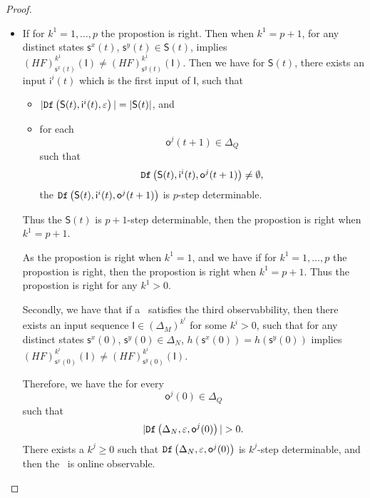 \begin{appendices}
\begin{proof}
\begin{itemize}
\item If for $k^1=1,\ldots, p$ the propostion is right. Then when $k^1=p+1$, for any distinct states $\mathsf{s}^{x}(t)$, $\mathsf{s}^{y}(t) \in \mathsf{S}(t)$, implies $(HF)^{k^1}_{\mathsf{s}^{x}(t)}(\mathsf{I})\neq (HF)^{k^1}_{\mathsf{s}^{y}(t)}(\mathsf{I})$. Then we have for $\mathsf{S}(t)$,
 there exists an input $\mathsf{i}^{i}(t)$ which is the first input of $\mathsf{I}$, such that
 \begin{itemize}
\item  $|{\tt Df}\left(\mathsf{S}(t),\mathsf{i}^{i}(t),\varepsilon\right)|=|\mathsf{S}(t)|$, and 
 \item  for each \[\mathsf{o}^{j}(t+1)\in \Delta_Q\] such that \[{\tt Df}\left(\mathsf{S}(t),\mathsf{i}^{i}(t),\mathsf{o}^{j}(t+1)\right)\ne \emptyset,\]  the ${\tt Df}\left(\mathsf{S}(t),\mathsf{i}^{i}(t),\mathsf{o}^{j}(t+1)\right)$ is $p$-step determinable.
 \end{itemize}
Thus the $\mathsf{S}(t)$ is $p+1$-step determinable, then the propostion is right when $k^1 =p+1$.

As the propostion is right when $k^1 =1$, and we have if for $k^1=1,\ldots, p$ the propostion is right, then the propostion is right when $k^1=p+1$. Thus the propostion is right for any $k^1>0$.

Secondly, we have that if a \BCN\ satisfies the third observabbility, then there exists an input sequence $\mathsf{I}\in(\Delta_M)^{k^i}$ for some $k^i >0$, such that for any distinct states $\mathsf{s}^{x}(0)$, $\mathsf{s}^{y}(0) \in \Delta_N$, $h(\mathsf{s}^{x}(0))=h(\mathsf{s}^{y}(0))$ implies $(HF)^{k^i}_{\mathsf{s}^{x}(0)}(\mathsf{I})\neq (HF)^{k^i}_{\mathsf{s}^{y}(0)}(\mathsf{I})$. 

Therefore, we have the for every \[\mathsf{o}^{j}(0)\in \Delta_Q\] such that \[|\Ded\left(\Delta_N,\varepsilon, \mathsf{o}^{j}(0)\right)|> 0.\] There exists a $k^{j}\ge0$ such that ${\tt Df}\left(\Delta_N,\varepsilon,\mathsf{o}^{j}(0)\right)$ is $k^{j}$-step determinable, and then the \BCN\ is online observable.
 \end{itemize}
\end{proof}

\end{appendices}
